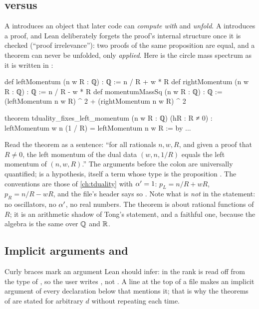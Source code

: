 \subsection{ versus }
A  introduces an object that later code can \emph{compute with} and
\emph{unfold}. A  introduces a proof, and Lean deliberately forgets the
proof's internal structure once it is checked (``proof irrelevance''): two proofs of the
same proposition are equal, and a theorem can never be unfolded, only \emph{applied}. Here
is the circle mass spectrum as it is written in
:
\begin{leancode}
def leftMomentum (n w R : ℚ) : ℚ := n / R + w * R
def rightMomentum (n w R : ℚ) : ℚ := n / R - w * R
def momentumMassSq (n w R : ℚ) : ℚ :=
  (leftMomentum n w R) ^ 2 + (rightMomentum n w R) ^ 2

theorem tduality_fixes_left_momentum (n w R : ℚ) (hR : R ≠ 0) :
    leftMomentum w n (1 / R) = leftMomentum n w R := by ...
\end{leancode}
Read the theorem as a sentence: ``for all rationals $n,w,R$, and given a proof 
that $R\neq0$, the left momentum of the dual data $(w,n,1/R)$ equals the left momentum of
$(n,w,R)$.'' The arguments before the colon are universally quantified;  is a
hypothesis, itself a term whose type is the proposition . The conventions are
those of \cref{ch:tduality} with $\alpha'=1$: $p_L = n/R + wR$, $p_R = n/R - wR$, and the file's
header says so . Note what is
\emph{not} in the statement: no oscillators, no $\alpha'$, no real numbers. The theorem is
about rational functions of $R$; it is an arithmetic shadow of Tong's statement, and a
faithful one, because the algebra is the same over $\mathbb{Q}$ and $\mathbb{R}$.

\subsection{Implicit arguments and }
Curly braces mark an argument Lean should infer: in 
the rank  is read off from the type of , so the user writes
, not . A line  at the
top of a file makes  an implicit argument of every declaration below that mentions
it; that is why the theorems of  are stated for arbitrary $d$ without
repeating  each time.

